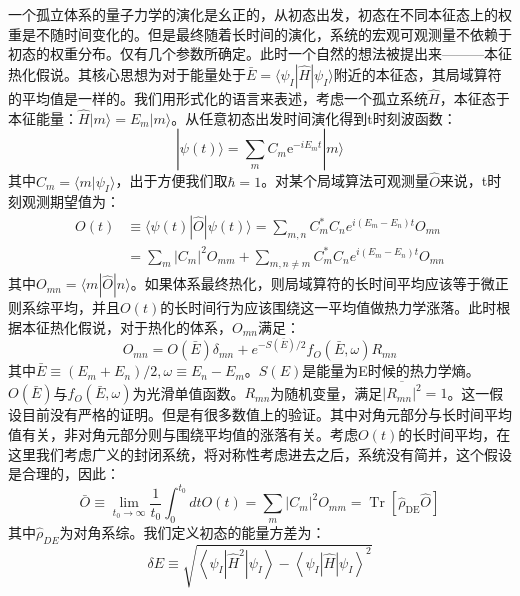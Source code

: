 一个孤立体系的量子力学的演化是幺正的，从初态出发，初态在不同本征态上的权重是不随时间变化的。但是最终随着长时间的演化，系统的宏观可观测量不依赖于初态的权重分布。仅有几个参数所确定。此时一个自然的想法被提出来———本征热化假说\cite{Deutsch1991quantum,Srednicki1994chaos,srednicki1999approach}。其核心思想为对于能量处于$\bar{E}=\langle\psi_I|\hat{H}|\psi_I\rangle$附近的本征态，其局域算符的平均值是一样的。我们用形式化的语言来表述，考虑一个孤立系统$\hat{H}$，本征态于本征能量：$\hat{H}|m\rangle=E_m|m\rangle$。从任意初态出发时间演化得到t时刻波函数：
\begin{equation}
|\psi(t)\rangle=\sum_{m} C_{m} \mathrm{e}^{-i E_{m} t}|m\rangle
\end{equation}
其中$C_m = \langle m | \psi_I\rangle$，出于方便我们取$\hbar=1$。对某个局域算法可观测量$\hat{O}$来说，t时刻观测期望值为：
\begin{equation}
\begin{aligned}
O(t) & \equiv\langle\psi(t)|\hat{O}| \psi(t)\rangle=\sum_{m, n} C_{m}^{*} C_{n} e^{i\left(E_{m}-E_{n}\right) t} O_{m n} \\
&=\sum_{m}\left|C_{m}\right|^{2} O_{m m}+\sum_{m, n \neq m} C_{m}^{*} C_{n} e^{i\left(E_{m}-E_{n}\right) t} O_{m n}
\end{aligned}
\end{equation}
其中$O_{m n}=\langle m|\hat{O}| n\rangle$。如果体系最终热化，则局域算符的长时间平均应该等于微正则系综平均，并且$O(t)$的长时间行为应该围绕这一平均值做热力学涨落。此时根据本征热化假说，对于热化的体系，$O_{mn}$满足：
\begin{equation}
O_{m n}=O(\bar{E}) \delta_{m n}+e^{-S(\bar{E}) / 2} f_{O}(\bar{E}, \omega) R_{m n}
\end{equation}
其中$\bar{E} \equiv\left(E_{m}+E_{n}\right) / 2, \omega \equiv E_{n}-E_{m}$。$S(E)$是能量为E时候的热力学熵。$O(\bar{E})$与$f_{O}(\bar{E}, \omega)$为光滑单值函数。$R_{m n}$为随机变量，满足$\overline{\left|R_{m n}\right|^{2}}=1$。这一假设目前没有严格的证明。但是有很多数值上的验证。其中对角元部分与长时间平均值有关，非对角元部分则与围绕平均值的涨落有关。考虑$O(t)$的长时间平均，在这里我们考虑广义的封闭系统，将对称性考虑进去之后，系统没有简并，这个假设是合理的，因此：
\begin{equation}
\bar{O} \equiv \lim _{t_{0} \rightarrow \infty} \frac{1}{t_{0}} \int_{0}^{t_{0}} d t O(t)=\sum_{m}\left|C_{m}\right|^{2} O_{m m}=\operatorname{Tr}\left[\hat{\rho}_{\mathrm{DE}} \hat{O}\right]
\end{equation}
其中$\hat{\rho}_{DE}$为对角系综。我们定义初态的能量方差为：
\begin{equation}
\delta E \equiv \sqrt{\left\langle\psi_{I}\left|\hat{H}^{2}\right| \psi_{I}\right\rangle-\left\langle\psi_{I}|\hat{H}| \psi_{I}\right\rangle^{2}}
\end{equation}
